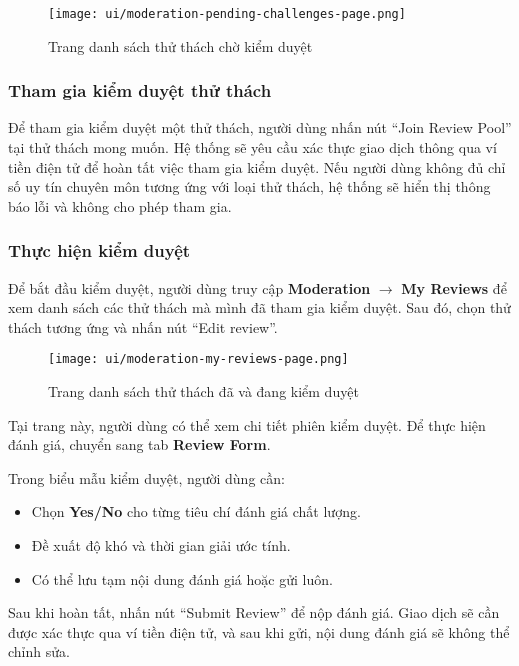 \begin{figure}[H]
  \centering
  \texttt{[image: ui/moderation-pending-challenges-page.png]}
  \caption{Trang danh sách thử thách chờ kiểm duyệt}
  \label{fig:moderation-pending-challenges-page}
\end{figure}

\subsubsection{Tham gia kiểm duyệt thử thách}

Để tham gia kiểm duyệt một thử thách, người dùng nhấn nút ``Join Review Pool'' tại thử thách mong muốn.  
Hệ thống sẽ yêu cầu xác thực giao dịch thông qua ví tiền điện tử để hoàn tất việc tham gia kiểm duyệt.
Nếu người dùng không đủ chỉ số uy tín chuyên môn tương ứng với loại thử thách, hệ thống sẽ hiển thị thông báo lỗi và không cho phép tham gia.

\subsubsection{Thực hiện kiểm duyệt}

Để bắt đầu kiểm duyệt, người dùng truy cập \textbf{Moderation} $\rightarrow$ \textbf{My Reviews} để xem danh sách các thử thách mà mình đã tham gia kiểm duyệt.  
Sau đó, chọn thử thách tương ứng và nhấn nút ``Edit review''.

\begin{figure}[H]
  \centering
  \texttt{[image: ui/moderation-my-reviews-page.png]}
  \caption{Trang danh sách thử thách đã và đang kiểm duyệt}
  \label{fig:moderation-my-reviews-page}
\end{figure}

Tại trang này, người dùng có thể xem chi tiết phiên kiểm duyệt.  
Để thực hiện đánh giá, chuyển sang tab \textbf{Review Form}.

Trong biểu mẫu kiểm duyệt, người dùng cần:
\begin{itemize}
  \item Chọn \textbf{Yes/No} cho từng tiêu chí đánh giá chất lượng.
  \item Đề xuất độ khó và thời gian giải ước tính.
  \item Có thể lưu tạm nội dung đánh giá hoặc gửi luôn.
\end{itemize}

Sau khi hoàn tất, nhấn nút ``Submit Review'' để nộp đánh giá.  
Giao dịch sẽ cần được xác thực qua ví tiền điện tử, và sau khi gửi, nội dung đánh giá sẽ không thể chỉnh sửa.

